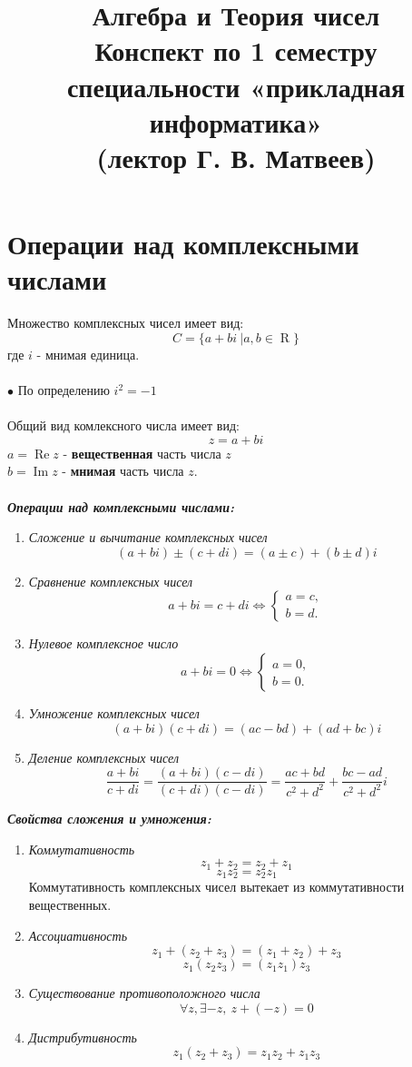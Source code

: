 \documentclass[a4paper, 12pt]{article}
\title{\vspace{6.5cm}\textbf{\Huge{Алгебра и Теория чисел}}\\Конспект по 1 семестру 
специальности «прикладная информатика»\\(лектор Г. В. Матвеев)}
\date{}
\newcommand{\R}{\operatorname{R}}
\renewcommand{\Re}{\operatorname{Re}}
\renewcommand{\Im}{\operatorname{Im}}
\begin{document}
\maketitle
\newpage
\tableofcontents{}
\newpage

\section{Операции над комплексными числами}
Множество комплексных чисел имеет вид:
$$C=\{a+bi \: |a,b \in \R \}$$
где $i$ - мнимая единица.\\\\
$\bullet$ По определению $i^2=-1$\\\\
Общий вид комлексного числа имеет вид:
$$z = a + bi$$
$a = \Re z$ - \textbf{вещественная} часть числа $z$\\
$b = \Im z$ - \textbf{мнимая} часть числа $z$.\\\\
\textit{\textbf{Операции над комплексными числами:}}\\
\begin{enumerate}
    \item \textit{Сложение и вычитание комплексных чисел}
    $$(a+bi) \pm (c+di) = (a \pm c) + (b \pm d)i$$
    \item \textit{Сравнение комплексных чисел}
    $$a+bi = c+di \Leftrightarrow \begin{cases} a = c,\\ b = d. \end{cases}$$
    \item \textit{Нулевое комплексное число}
    $$a + bi = 0 \Leftrightarrow \begin{cases} a = 0,\\ b = 0. \end{cases}$$
    \item \textit{Умножение комплексных чисел}
    $$(a+bi)(c+di)=(ac-bd)+(ad+bc)i$$
    \item \textit{Деление комплексных чисел}
    $$\frac{a+bi}{c+di} = \frac {(a+bi)(c-di)}{(c+di)(c-di)} = \frac {ac+bd}{c^2+d^2}+\frac{bc-ad}{c^2+d^2}i$$
\end{enumerate}
\textit{\textbf{Свойства сложения и умножения:}}
\begin{enumerate}
    \item \textit{Коммутативность}
    $$z_1 + z_2 = z_2 + z_1$$
    $$z_1z_2=z_2z_1$$
    Коммутативность комплексных чисел вытекает из коммутативности вещественных.
    \item \textit{Ассоциативность}
    $$z_1 + (z_2 + z_3) = (z_1 + z_2) + z_3$$
    $$z_1(z_2z_3)=(z_1z_1)z_3$$
    \item \textit{Существование противоположного числа}
    $$\forall z, \exists -z, \: z+(-z)=0$$
    \item \textit{Дистрибутивность}
    $$z_1(z_2+z_3)=z_1z_2+z_1z_3$$
\end{enumerate}
\end{document}
